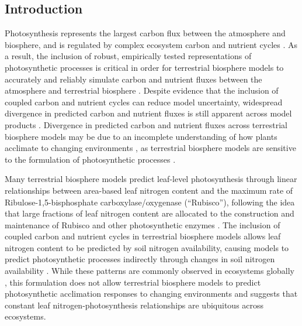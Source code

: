 \begin{singlespace}
    \chapter{\textbf{Introduction}}
\end{singlespace}

\noindent Photosynthesis represents the largest carbon flux between the atmosphere and biosphere, and is regulated by complex ecosystem carbon and nutrient cycles . As a result, the inclusion of robust, empirically tested representations of photosynthetic processes is critical in order for terrestrial biosphere models to accurately and reliably simulate carbon and nutrient fluxes between the atmosphere and terrestrial biosphere . Despite evidence that the inclusion of coupled carbon and nutrient cycles can reduce model uncertainty, widespread divergence in predicted carbon and nutrient fluxes is still apparent across model products . Divergence in predicted carbon and nutrient fluxes across terrestrial biosphere models may be due to an incomplete understanding of how plants acclimate to changing environments , as terrestrial biosphere models are sensitive to the formulation of photosynthetic processes .

Many terrestrial biosphere models predict leaf-level photosynthesis through linear relationships between area-based leaf nitrogen content and the maximum rate of Ribulose-1,5-bisphosphate carboxylase/oxygenase (``Rubisco''), following the idea that large fractions of leaf nitrogen content are allocated to the construction and maintenance of Rubisco and other photosynthetic enzymes . The inclusion of coupled carbon and nutrient cycles in terrestrial biosphere models  allows leaf nitrogen content to be predicted by soil nitrogen availability, causing models to predict photosynthetic processes indirectly through changes in soil nitrogen availability . While these patterns are commonly observed in ecosystems globally , this formulation does not allow terrestrial biosphere models to predict photosynthetic acclimation responses to changing environments  and suggests that constant leaf nitrogen-photosynthesis relationships are ubiquitous across ecosystems.

